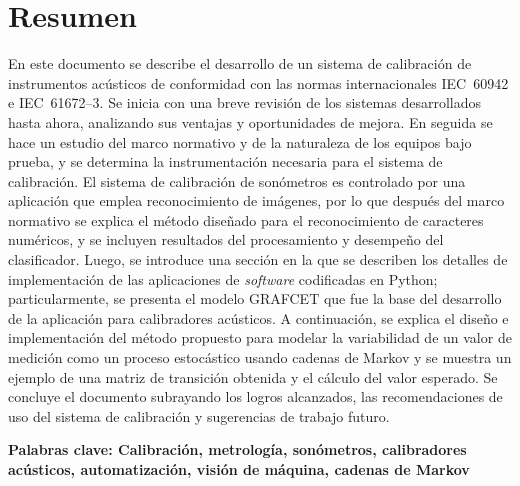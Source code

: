 \chapter*{Resumen}
En este documento se describe el desarrollo de un sistema de calibración de instrumentos acústicos de conformidad con
las
normas internacionales \mbox{IEC 60942} e \mbox{IEC 61672--3}.
Se inicia con una breve revisión de los sistemas desarrollados hasta ahora, analizando sus ventajas y oportunidades de
mejora.
En seguida se hace un estudio del marco normativo y de la naturaleza de los equipos bajo prueba, y se determina la
instrumentación necesaria para el sistema de calibración.
El sistema de calibración de sonómetros es controlado por una aplicación que emplea reconocimiento de imágenes, por lo
que después del marco normativo se explica el método diseñado para el reconocimiento de caracteres numéricos, y se
incluyen
resultados del procesamiento y desempeño del clasificador.
Luego, se introduce una sección en la que se describen los detalles de implementación de las aplicaciones de
\emph{software}
codificadas en Python;
particularmente, se presenta el modelo GRAFCET que fue la base del desarrollo de la aplicación para calibradores
acústicos.
A continuación, se explica el diseño e implementación del método propuesto para modelar la variabilidad de un valor
de medición
como un proceso estocástico usando cadenas de Markov y se muestra un ejemplo de una matriz de transición obtenida y el
cálculo del valor esperado.
Se concluye el documento subrayando los logros alcanzados, las recomendaciones de uso del sistema de calibración
y sugerencias de trabajo futuro.

\textbf{\small Palabras clave: Calibración, metrología, sonómetros, calibradores acústicos, automatización,
    visión de máquina, cadenas de Markov} \vspace{2em}

\vfill
\pagebreak

